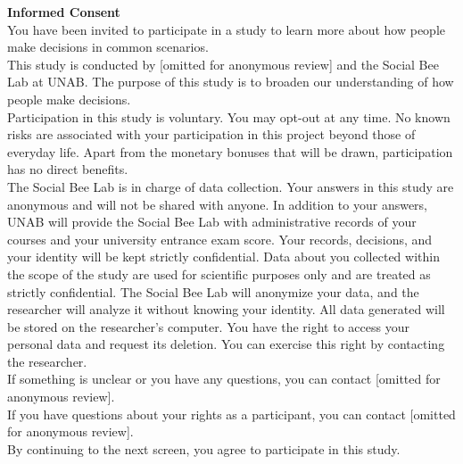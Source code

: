 \documentclass[11pt,a4paper,oneside]{article}
\begin{document}
\noindent \textbf{Informed Consent} \\ 

\noindent You have been invited to participate in a study to learn more about how people make decisions in common scenarios. \\

\noindent  This study is conducted by [omitted for anonymous review] and the Social Bee Lab at UNAB. The purpose of this study is to broaden our understanding of how people make decisions. \\


\noindent  Participation in this study is voluntary. You may opt-out at any time. No known risks are associated with your participation in this project beyond those of everyday life. Apart from the monetary bonuses that will be drawn, participation has no direct benefits.\\

\noindent  The Social Bee Lab is in charge of data collection. Your answers in this study are anonymous and will not be shared with anyone. In addition to your answers, UNAB will provide the Social Bee Lab with administrative records of your courses and your university entrance exam score. Your records, decisions, and your identity will be kept strictly confidential. Data about you collected within the scope of the study are used for scientific purposes only and are treated as strictly confidential. The Social Bee Lab will anonymize your data, and the researcher will analyze it without knowing your identity. All data generated will be stored on the researcher's computer. You have the right to access your personal data and request its deletion. You can exercise this right by contacting the researcher.\\

\noindent  If something is unclear or you have any questions, you can contact [omitted for anonymous review].\\


\noindent  If you have questions about your rights as a participant, you can contact [omitted for anonymous review].\\


\noindent  By continuing to the next screen, you agree to participate in this study.\\
\end{document}
